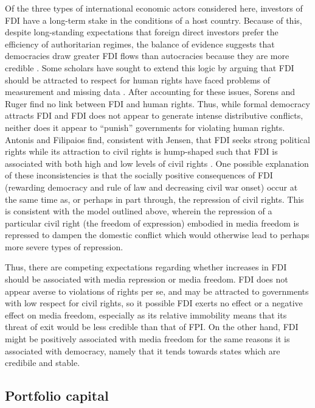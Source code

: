 \documentclass[12pt,a4paper]{article}\usepackage[]{graphicx}\usepackage[]{color}
\begin{document}
Of the three types of international economic actors considered here, investors of FDI have a long-term stake in the conditions of a host country. Because of this, despite long-standing expectations that foreign direct investors prefer the efficiency of authoritarian regimes, the balance of evidence suggests that democracies draw greater FDI flows than autocracies because they are more credible \parencite{Jensen:2003to}. Some scholars have sought to extend this logic by arguing that FDI should be attracted to respect for human rights \parencite{Blanton:2007gu} have faced problems of measurement and missing data \parencite{Sorens:2012hc}. After accounting for these issues, Sorens and Ruger find no link between FDI and human rights. Thus, while formal democracy attracts FDI and FDI does not appear to generate intense distributive conflicts, neither does it appear to “punish” governments for violating human rights. Antonis and Filipaios find, consistent with Jensen, that FDI seeks strong political rights while its attraction to civil rights is hump-shaped such that FDI is associated with both high and low levels of civil rights \parencite*{Adam:2007gn}. One possible explanation of these inconsistencies is that the socially positive consequences of FDI (rewarding democracy and rule of law and decreasing civil war onset) occur at the same time as, or perhaps in part through, the repression of civil rights. This is consistent with the model outlined above, wherein the repression of a particular civil right (the freedom of expression) embodied in media freedom is repressed to dampen the domestic conflict which would otherwise lead to perhaps more severe types of repression.

Thus, there are competing expectations regarding whether increases in FDI should be associated with media repression or media freedom. FDI does not appear averse to violations of rights per se, and may be attracted to governments with low respect for civil rights, so it possible FDI exerts no effect or a negative effect on media freedom, especially as its relative immobility means that its threat of exit would be less credible than that of FPI. On the other hand, FDI might be positively associated with media freedom for the same reasons it is associated with democracy, namely that it tends towards states which are credibile and stable.

\subsection{Portfolio capital}
\end{document}
